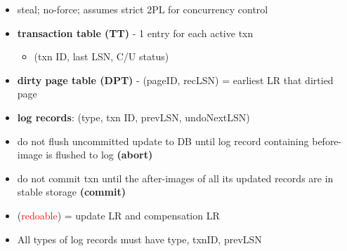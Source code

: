 \documentclass[10pt, landscape]{article}
\makeatletter
\renewcommand{\subsubsection}{\@startsection{subsubsection}{3}{0mm}%
  {-1ex plus -.5ex minus -.2ex}%
  {1ex plus .2ex}%
{\normalfont\small\bfseries}}%
\makeatother
\begin{document}
\begin{multicols*}{4}
  \begin{itemize}
    \item steal; no-force; assumes strict 2PL for concurrency control
    \item \textbf{transaction table (TT)} - 1 entry for each active txn
      \begin{itemize}
        \item (txn ID, last LSN, C/U status)
      \end{itemize}
    \item \textbf{dirty page table (DPT)} - (pageID, recLSN) = earliest LR that dirtied page
    \item \textbf{log records}: (type, txn ID, prevLSN, undoNextLSN)
    \item {} do not flush uncommitted update to DB until log record containing before-image is flushed to log \textbf{(abort)}
    \item {} do not commit txn until the after-images of all its updated records are in stable storage \textbf{(commit)}
    \item (\attention \textcolor{red}{redoable}) = update LR and compensation LR
    \item All types of log records must have type, txnID, prevLSN
  \end{itemize}



\end{multicols*}
\end{document}
